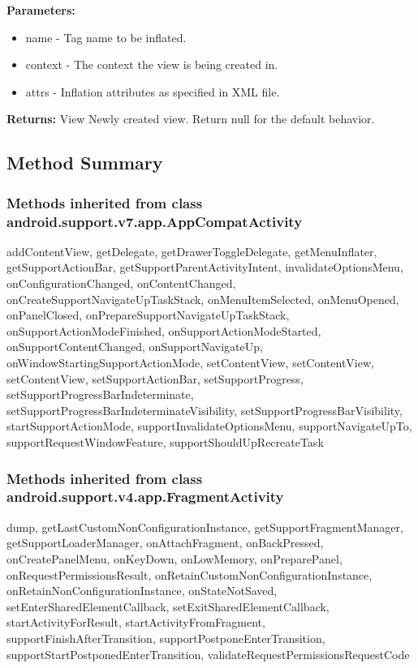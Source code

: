 \textbf{Parameters:}
\begin{itemize}
\item name - Tag name to be inflated.
\item context - The context the view is being created in.
\item attrs - Inflation attributes as specified in XML file.
\end{itemize}

\textbf{Returns:}
\tab                View Newly created view. Return null for the default behavior.\\


\subsection{Method Summary}

\subsubsection{Methods inherited from class android.support.v7.app.AppCompatActivity}

addContentView, getDelegate, getDrawerToggleDelegate, getMenuInflater, getSupportActionBar, getSupportParentActivityIntent, invalidateOptionsMenu, onConfigurationChanged, onContentChanged, onCreateSupportNavigateUpTaskStack, onMenuItemSelected, onMenuOpened, onPanelClosed, onPrepareSupportNavigateUpTaskStack, onSupportActionModeFinished, onSupportActionModeStarted, onSupportContentChanged, onSupportNavigateUp, onWindowStartingSupportActionMode, setContentView, setContentView, setContentView, setSupportActionBar, setSupportProgress, setSupportProgressBarIndeterminate, setSupportProgressBarIndeterminateVisibility, setSupportProgressBarVisibility, startSupportActionMode, supportInvalidateOptionsMenu, supportNavigateUpTo, supportRequestWindowFeature, supportShouldUpRecreateTask\\

\subsubsection{Methods inherited from class android.support.v4.app.FragmentActivity}

dump, getLastCustomNonConfigurationInstance, getSupportFragmentManager, getSupportLoaderManager, onAttachFragment, onBackPressed, onCreatePanelMenu, onKeyDown, onLowMemory, onPreparePanel, onRequestPermissionsResult, onRetainCustomNonConfigurationInstance, onRetainNonConfigurationInstance, onStateNotSaved, setEnterSharedElementCallback, setExitSharedElementCallback, startActivityForResult, startActivityFromFragment, supportFinishAfterTransition, supportPostponeEnterTransition, supportStartPostponedEnterTransition, validateRequestPermissionsRequestCode\\

